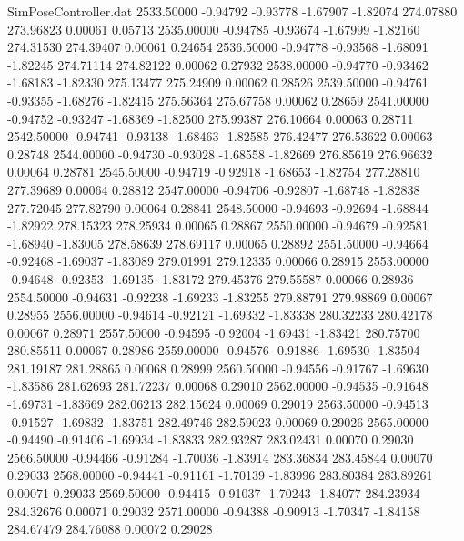 \begin{filecontents}{SimPoseController.dat}
2533.50000   -0.94792   -0.93778    -1.67907   -1.82074  274.07880  273.96823    0.00061    0.05713
2535.00000   -0.94785   -0.93674    -1.67999   -1.82160  274.31530  274.39407    0.00061    0.24654
2536.50000   -0.94778   -0.93568    -1.68091   -1.82245  274.71114  274.82122    0.00062    0.27932
2538.00000   -0.94770   -0.93462    -1.68183   -1.82330  275.13477  275.24909    0.00062    0.28526
2539.50000   -0.94761   -0.93355    -1.68276   -1.82415  275.56364  275.67758    0.00062    0.28659
2541.00000   -0.94752   -0.93247    -1.68369   -1.82500  275.99387  276.10664    0.00063    0.28711
2542.50000   -0.94741   -0.93138    -1.68463   -1.82585  276.42477  276.53622    0.00063    0.28748
2544.00000   -0.94730   -0.93028    -1.68558   -1.82669  276.85619  276.96632    0.00064    0.28781
2545.50000   -0.94719   -0.92918    -1.68653   -1.82754  277.28810  277.39689    0.00064    0.28812
2547.00000   -0.94706   -0.92807    -1.68748   -1.82838  277.72045  277.82790    0.00064    0.28841
2548.50000   -0.94693   -0.92694    -1.68844   -1.82922  278.15323  278.25934    0.00065    0.28867
2550.00000   -0.94679   -0.92581    -1.68940   -1.83005  278.58639  278.69117    0.00065    0.28892
2551.50000   -0.94664   -0.92468    -1.69037   -1.83089  279.01991  279.12335    0.00066    0.28915
2553.00000   -0.94648   -0.92353    -1.69135   -1.83172  279.45376  279.55587    0.00066    0.28936
2554.50000   -0.94631   -0.92238    -1.69233   -1.83255  279.88791  279.98869    0.00067    0.28955
2556.00000   -0.94614   -0.92121    -1.69332   -1.83338  280.32233  280.42178    0.00067    0.28971
2557.50000   -0.94595   -0.92004    -1.69431   -1.83421  280.75700  280.85511    0.00067    0.28986
2559.00000   -0.94576   -0.91886    -1.69530   -1.83504  281.19187  281.28865    0.00068    0.28999
2560.50000   -0.94556   -0.91767    -1.69630   -1.83586  281.62693  281.72237    0.00068    0.29010
2562.00000   -0.94535   -0.91648    -1.69731   -1.83669  282.06213  282.15624    0.00069    0.29019
2563.50000   -0.94513   -0.91527    -1.69832   -1.83751  282.49746  282.59023    0.00069    0.29026
2565.00000   -0.94490   -0.91406    -1.69934   -1.83833  282.93287  283.02431    0.00070    0.29030
2566.50000   -0.94466   -0.91284    -1.70036   -1.83914  283.36834  283.45844    0.00070    0.29033
2568.00000   -0.94441   -0.91161    -1.70139   -1.83996  283.80384  283.89261    0.00071    0.29033
2569.50000   -0.94415   -0.91037    -1.70243   -1.84077  284.23934  284.32676    0.00071    0.29032
2571.00000   -0.94388   -0.90913    -1.70347   -1.84158  284.67479  284.76088    0.00072    0.29028

\end{filecontents}
